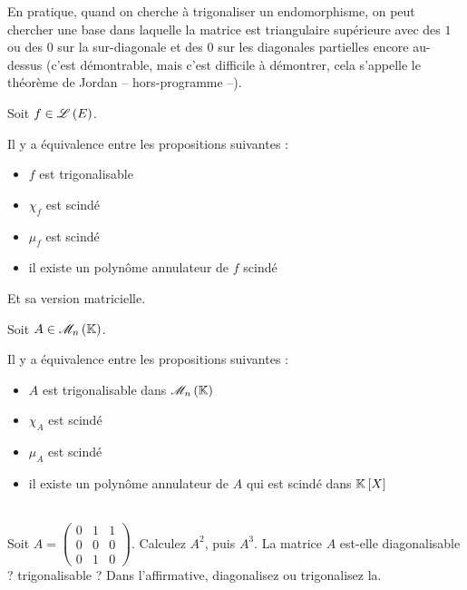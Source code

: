 En pratique, quand on cherche à trigonaliser un endomorphisme, on peut chercher une base dans laquelle la matrice est triangulaire supérieure avec des \(1\) ou des \(0\) sur la sur-diagonale et des \(0\) sur les diagonales partielles encore au-dessus (c'est démontrable, mais c'est difficile à démontrer, cela s'appelle le théorème de Jordan -- hors-programme --).

\begin{theo}
Soit \(f\in\mathscr{L}\left(E\right)\).

Il y a équivalence entre les propositions suivantes :

\begin{itemize}
    \item \(f\)  est trigonalisable \\
    \item \(\chi_f\) est scindé \\
    \item \(\mu_f\) est scindé \\
    \item il existe un polynôme annulateur de \(f\) scindé
\end{itemize}
\end{theo}

Et sa version matricielle.

\begin{theo}
Soit \(A\in\M{n}\).

Il y a équivalence entre les propositions suivantes :

\begin{itemize}
    \item \(A\) est trigonalisable dans \(\M{n}\) \\
    \item \(\chi_A\) est scindé \\
    \item \(\mu_A\) est scindé \\
    \item il existe un polynôme annulateur de \(A\) qui est scindé dans \(\poly\)
\end{itemize}
\end{theo}

\begin{exo}~\\
Soit \(A=\begin{pmatrix}
0 & 1 & 1 \\
0 & 0 & 0 \\
0 & 1 & 0
\end{pmatrix}\). Calculez \(A^2\), puis \(A^3\). La matrice \(A\) est-elle diagonalisable ? trigonalisable ? Dans l'affirmative, diagonalisez ou trigonalisez la.
\end{exo}

